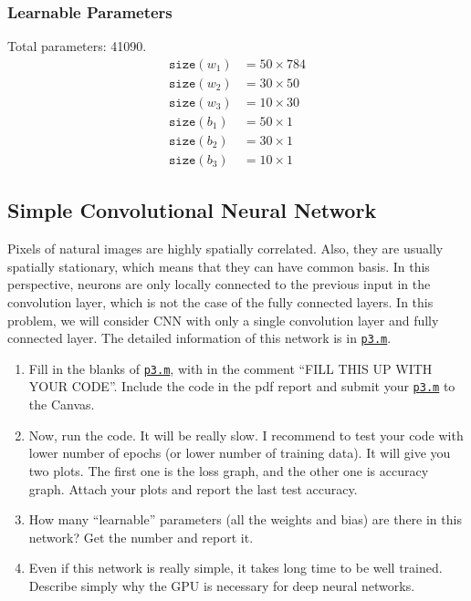 \subsubsection{Learnable Parameters}
Total parameters: 41090.
\begin{align*}
    \texttt{size}(w_1)&=50\times784\\
    \texttt{size}(w_2)&=30\times50\\
    \texttt{size}(w_3)&=10\times30\\
    \texttt{size}(b_1)&=50\times1\\
    \texttt{size}(b_2)&=30\times1\\
    \texttt{size}(b_3)&=10\times1
\end{align*}



\newpage
\subsection{Simple Convolutional Neural Network}
Pixels of natural images are highly spatially correlated.
Also, they are usually spatially stationary, which means that they can have common basis.
In this perspective, neurons are only locally connected to the previous input in the convolution layer, which is not the case of the fully connected layers.
In this problem, we will consider CNN with only a single convolution layer and fully connected layer.
The detailed information of this network is in \href{./hw6/p3.m}{\texttt{p3.m}}.
\begin{enumerate}
    \item Fill in the blanks of \href{./hw6/p3.m}{\texttt{p3.m}}, with in the comment ``FILL THIS UP WITH YOUR CODE''.
    Include the code in the pdf report and submit your \href{./hw6/p3.m}{\texttt{p3.m}} to the Canvas.
    \item Now, run the code.
    It will be really slow.
    I recommend to test your code with lower number of epochs (or lower number of training data).
    It will give you two plots.
    The first one is the loss graph, and the other one is accuracy graph.
    Attach your plots and report the last test accuracy.
    \item How many ``learnable'' parameters (all the weights and bias) are there in this network?
    Get the number and report it.
    \item Even if this network is really simple, it takes long time to be well trained.
    Describe simply why the GPU is necessary for deep neural networks.
\end{enumerate}
